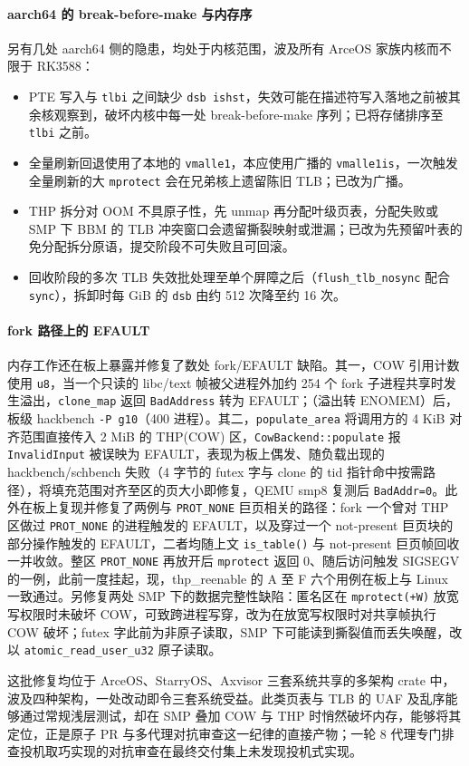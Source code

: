 \paragraph{aarch64 的 break-before-make 与内存序}
另有几处 aarch64 侧的隐患，均处于内核范围，波及所有 ArceOS 家族内核而不限于 RK3588：

\begin{itemize}
\item PTE 写入与 \texttt{tlbi} 之间缺少 \texttt{dsb ishst}，失效可能在描述符写入落地之前被其余核观察到，破坏内核中每一处 break-before-make 序列；已将存储排序至 \texttt{tlbi} 之前。
\item 全量刷新回退使用了本地的 \texttt{vmalle1}，本应使用广播的 \texttt{vmalle1is}，一次触发全量刷新的大 \texttt{mprotect} 会在兄弟核上遗留陈旧 TLB；已改为广播。
\item THP 拆分对 OOM 不具原子性，先 unmap 再分配叶级页表，分配失败或 SMP 下 BBM 的 TLB 冲突窗口会遗留撕裂映射或泄漏；已改为先预留叶表的免分配拆分原语，提交阶段不可失败且可回滚。
\item 回收阶段的多次 TLB 失效批处理至单个屏障之后（\texttt{flush\_tlb\_nosync} 配合 \texttt{sync}），拆卸时每 GiB 的 \texttt{dsb} 由约 512 次降至约 16 次。
\end{itemize}

\paragraph{fork 路径上的 EFAULT}
内存工作还在板上暴露并修复了数处 fork/EFAULT 缺陷。其一，COW 引用计数使用 \texttt{u8}，当一个只读的 libc/text 帧被父进程外加约 254 个 fork 子进程共享时发生溢出，\texttt{clone\_map} 返回 \texttt{BadAddress} 转为 EFAULT；（溢出转 ENOMEM）后，板级 hackbench \texttt{-P g10}（400 进程）。其二，\texttt{populate\_area} 将调用方的 4 KiB 对齐范围直接传入 2 MiB 的 THP(COW) 区，\texttt{CowBackend::populate} 报 \texttt{InvalidInput} 被误映为 EFAULT，表现为板上偶发、随负载出现的 hackbench/schbench 失败（4 字节的 futex 字与 clone 的 tid 指针命中按需路径），将填充范围对齐至区的页大小即修复，QEMU smp8 复测后 \texttt{BadAddr=0}。此外在板上复现并修复了两例与 \texttt{PROT\_NONE} 巨页相关的路径：fork 一个曾对 THP 区做过 \texttt{PROT\_NONE} 的进程触发的 EFAULT，以及穿过一个 not-present 巨页块的部分操作触发的 EFAULT，二者均随上文 \texttt{is\_table()} 与 not-present 巨页帧回收一并收敛。整区 \texttt{PROT\_NONE} 再放开后 \texttt{mprotect} 返回 0、随后访问触发 SIGSEGV 的一例，此前一度挂起，现，thp\_reenable 的 A 至 F 六个用例在板上与 Linux 一致通过。另修复两处 SMP 下的数据完整性缺陷：匿名区在 \texttt{mprotect(+W)} 放宽写权限时未破坏 COW，可致跨进程写穿，改为在放宽写权限时对共享帧执行 COW 破坏；futex 字此前为非原子读取，SMP 下可能读到撕裂值而丢失唤醒，改以 \texttt{atomic\_read\_user\_u32} 原子读取。

这批修复均位于 ArceOS、StarryOS、Axvisor 三套系统共享的多架构 crate 中，波及四种架构，一处改动即令三套系统受益。此类页表与 TLB 的 UAF 及乱序能够通过常规浅层测试，却在 SMP 叠加 COW 与 THP 时悄然破坏内存，能够将其定位，正是原子 PR 与多代理对抗审查这一纪律的直接产物；一轮 8 代理专门排查投机取巧实现的对抗审查在最终交付集上未发现投机式实现。

